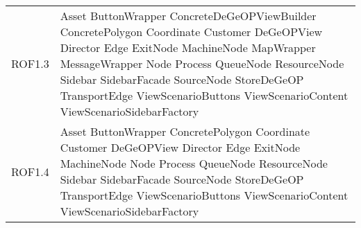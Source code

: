 \begin{longtable}{p{2.5cm}!{\VRule[1pt]}p{5cm}}
		ROF1.3 & Asset \newline ButtonWrapper \newline ConcreteDeGeOPViewBuilder \newline ConcretePolygon \newline Coordinate \newline Customer \newline DeGeOPView \newline Director \newline Edge \newline ExitNode \newline MachineNode \newline MapWrapper \newline MessageWrapper \newline Node \newline Process \newline QueueNode \newline ResourceNode \newline Sidebar \newline SidebarFacade \newline SourceNode \newline StoreDeGeOP \newline TransportEdge \newline ViewScenarioButtons \newline ViewScenarioContent \newline ViewScenarioSidebarFactory\\
		ROF1.4 & Asset \newline ButtonWrapper \newline ConcretePolygon \newline Coordinate \newline Customer \newline DeGeOPView \newline Director \newline Edge \newline ExitNode \newline MachineNode \newline Node \newline Process \newline QueueNode \newline ResourceNode \newline Sidebar \newline SidebarFacade \newline SourceNode \newline StoreDeGeOP \newline TransportEdge \newline ViewScenarioButtons \newline ViewScenarioContent \newline ViewScenarioSidebarFactory\\

\end{longtable}
